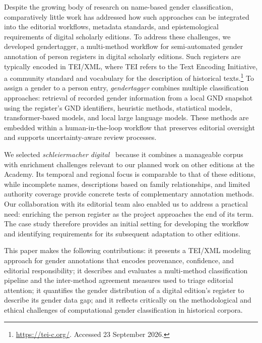 \documentclass{eceasst}
\begin{document}
Despite the growing body of research on name-based gender classification, comparatively little work has addressed how such approaches can be integrated into the editorial workflows, metadata standards, and epistemological requirements of digital scholarly editions. To address these challenges, we developed gendertagger, a multi-method workflow for semi-automated gender annotation of person registers in digital scholarly editions. Such registers are typically encoded in TEI/XML, where TEI refers to the Text Encoding Initiative, a community standard and vocabulary for the description of historical texts.\footnote{\url{https://tei-c.org/}. Accessed 23 September 2026.} To assign a gender to a person entry, \textit{gendertagger} combines multiple classification approaches: retrieval of recorded gender information from a local GND snapshot using the register's GND identifiers, heuristic methods, statistical models, transformer-based models, and local large language models. These methods are embedded within a human-in-the-loop workflow that preserves editorial oversight and supports uncertainty-aware review processes.

We selected \textit{schleiermacher digital}~\cite{arndt_schleiermacher_2012} because it combines a manageable corpus with enrichment challenges relevant to our planned work on other editions at the Academy. Its temporal and regional focus is comparable to that of these editions, while incomplete names, descriptions based on family relationships, and limited authority coverage provide concrete tests of complementary annotation methods. Our collaboration with its editorial team also enabled us to address a practical need: enriching the person register as the project approaches the end of its term. The case study therefore provides an initial setting for developing the workflow and identifying requirements for its subsequent adaptation to other editions.

This paper makes the following contributions: it presents a TEI/XML modeling approach for gender annotations that encodes provenance, confidence, and editorial responsibility; it describes and evaluates a multi-method classification pipeline and the inter-method agreement measures used to triage editorial attention; it quantifies the gender distribution of a digital edition's register to describe its gender data gap; and it reflects critically on the methodological and ethical challenges of computational gender classification in historical corpora.
\end{document}
